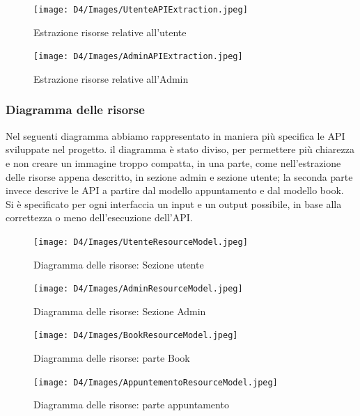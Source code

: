 \documentclass{article}
\begin{document}
\begin{figure}[H]
    \centering
    \texttt{[image: D4/Images/UtenteAPIExtraction.jpeg]}
    \caption{Estrazione risorse relative all'utente}
\end{figure}

\begin{figure}[H]
    \centering
    \texttt{[image: D4/Images/AdminAPIExtraction.jpeg]}
    \caption{Estrazione risorse relative all'Admin}
\end{figure}

\subsubsection{Diagramma delle risorse}
Nel seguenti diagramma abbiamo rappresentato in maniera più specifica le API sviluppate nel progetto.
il diagramma è stato diviso, per permettere più chiarezza e non creare un immagine troppo compatta, in una parte, come nell'estrazione delle risorse appena descritto, in sezione admin e sezione utente; la seconda parte invece descrive le API a partire dal  modello appuntamento e dal modello book.\\ Si è specificato per ogni interfaccia un input e un output possibile, in base alla correttezza o meno dell'esecuzione dell'API.

\begin{figure}[H]
    \centering
    \texttt{[image: D4/Images/UtenteResourceModel.jpeg]}
    \caption{Diagramma delle risorse: Sezione utente}

\end{figure}

\begin{figure}[H]
    \centering
    \texttt{[image: D4/Images/AdminResourceModel.jpeg]}
    \caption{Diagramma delle risorse: Sezione Admin}

\end{figure}

\begin{figure}[H]
    \centering
    \texttt{[image: D4/Images/BookResourceModel.jpeg]}
    \caption{Diagramma delle risorse: parte Book}

\end{figure}

\begin{figure}[H]
    \centering
    \texttt{[image: D4/Images/AppuntementoResourceModel.jpeg]}
    \caption{Diagramma delle risorse: parte appuntamento}
\end{figure}
\end{document}
